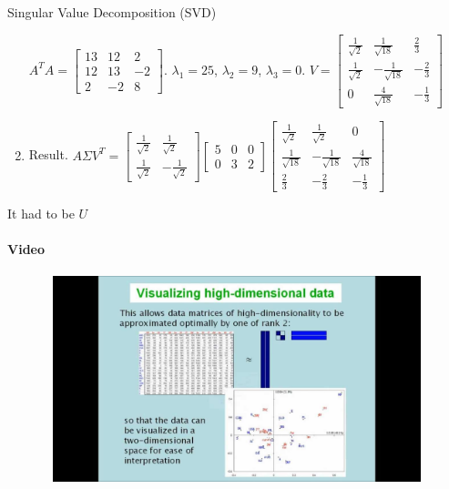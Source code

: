 \documentclass[aspectratio=169]{beamer}
\begin{document}
\begin{frame}[t]{Singular Value Decomposition (SVD)}
\begin{enumerate}
        $A^TA= \begin{bmatrix}
        13 & 12 & 2 \\
        12 & 13 & -2 \\ 
        2 & -2  & 8 
        \end{bmatrix}$. $\lambda_1 = 25$, $\lambda_2 = 9$, $\lambda_3 = 0$. $V = \begin{bmatrix}
            \frac{1}{\sqrt{2}} & \frac{1}{\sqrt{18}} & \frac{2}{3} \\
            \frac{1}{\sqrt{2}} & -\frac{1}{\sqrt{18}} & -\frac{2}{3}\\ 
            0 & \frac{4}{\sqrt{18}} & -\frac{1}{3}  
        \end{bmatrix}$
    \item Result. $A\Sigma V^T=\begin{bmatrix}
        \frac{1}{\sqrt{2}} & \frac{1}{\sqrt{2}}\\ 
        \frac{1}{\sqrt{2}} &  -\frac{1}{\sqrt{2}}
    \end{bmatrix}\begin{bmatrix}
    5 & 0 & 0 \\
    0 & 3 & 2 
    \end{bmatrix}\begin{bmatrix}
        \frac{1}{\sqrt{2}} & \frac{1}{\sqrt{2}} & 0 \\
        \frac{1}{\sqrt{18}} & -\frac{1}{\sqrt{18}} & \frac{4}{\sqrt{18}}\\ 
        \frac{2}{3} & -\frac{2}{3} & -\frac{1}{3}  
    \end{bmatrix}$
    \end{enumerate}
\end{frame}

\begin{frame}[t]{It had to be $U$}  
    \framesubtitle{Video}
    \vspace{-0.6cm}
    \begin{figure}[H]
        \href{https://youtu.be/JEYLfIVvR9I}{
            \centering\includegraphics[height=6cm,width=1\textwidth,keepaspectratio]{svd_song.jpg}}
        \label{fig:file_name}
    \end{figure}
\end{frame}
\end{document}
